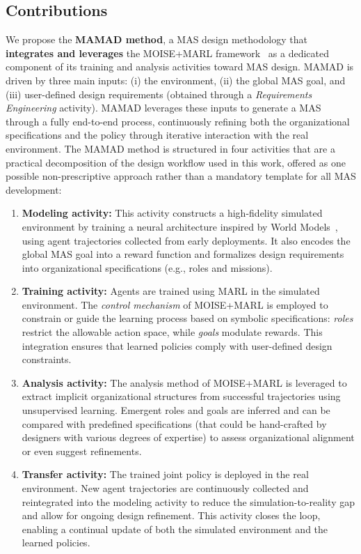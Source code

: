 \documentclass[pdflatex,sn-mathphys-num]{sn-jnl}%
\theoremstyle{thmstyleone}%
\theoremstyle{thmstyletwo}%
\theoremstyle{thmstylethree}%
\begin{document}
\subsection{Contributions}

We propose the \textbf{MAMAD method}, a MAS design methodology that \textbf{integrates and leverages} the MOISE+MARL framework~\cite{soule2025moisemarl} as a dedicated component of its training and analysis activities toward MAS design. MAMAD is driven by three main inputs: (i) the environment, (ii) the global MAS goal, and (iii) user-defined design requirements (obtained through a \textit{Requirements Engineering} activity). MAMAD leverages these inputs to generate a MAS through a fully end-to-end process, continuously refining both the organizational specifications and the policy through iterative interaction with the real environment.
The MAMAD method is structured in four activities that are a practical decomposition of the design workflow used in this work, offered as one possible non-prescriptive approach rather than a mandatory template for all MAS development:

\begin{enumerate}
    \item \textbf{Modeling activity:} This activity constructs a high-fidelity simulated environment by training a neural architecture inspired by World Models~\cite{Ha2018}, using agent trajectories collected from early deployments. It also encodes the global MAS goal into a reward function and formalizes design requirements into organizational specifications (e.g., roles and missions).
          
    \item \textbf{Training activity:} Agents are trained using MARL in the simulated environment. The \textit{control mechanism} of MOISE+MARL is employed to constrain or guide the learning process based on symbolic specifications: \textit{roles} restrict the allowable action space, while \textit{goals} modulate rewards. This integration ensures that learned policies comply with user-defined design constraints.
          
    \item \textbf{Analysis activity:} The analysis method of MOISE+MARL is leveraged to extract implicit organizational structures from successful trajectories using unsupervised learning. Emergent roles and goals are inferred and can be compared with predefined specifications (that could be hand-crafted by designers with various degrees of expertise) to assess organizational alignment or even suggest refinements.
          
    \item \textbf{Transfer activity:} The trained joint policy is deployed in the real environment. New agent trajectories are continuously collected and reintegrated into the modeling activity to reduce the simulation-to-reality gap and allow for ongoing design refinement. This activity closes the loop, enabling a continual update of both the simulated environment and the learned policies.
\end{enumerate}
\end{document}
